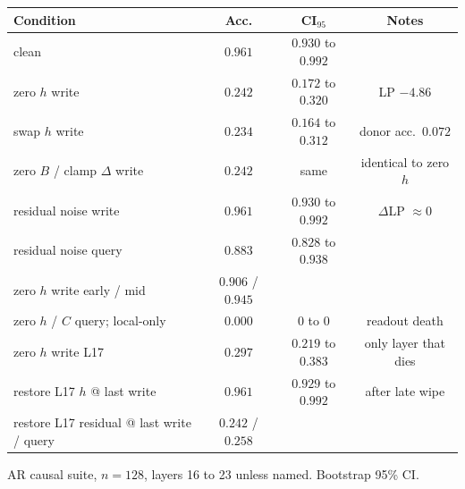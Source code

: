 \documentclass[11pt]{article}
\begin{document}
\begin{center}
\small
\begin{tabular}{@{}lccc@{}}
\toprule
Condition & Acc. & CI$_{95}$ & Notes \\
\midrule
clean & $0.961$ & $0.930$ to $0.992$ & \\
zero $h$ write & $0.242$ & $0.172$ to $0.320$ & LP $-4.86$ \\
swap $h$ write & $0.234$ & $0.164$ to $0.312$ & donor acc.\ $0.072$ \\
zero $B$ / clamp $\Delta$ write & $0.242$ & same & identical to zero $h$ \\
residual noise write & $0.961$ & $0.930$ to $0.992$ & $\Delta$LP $\approx 0$ \\
residual noise query & $0.883$ & $0.828$ to $0.938$ & \\
zero $h$ write early / mid & $0.906$ / $0.945$ & & \\
zero $h$ / $C$ query; local-only & $0.000$ & $0$ to $0$ & readout death \\
zero $h$ write L17 & $0.297$ & $0.219$ to $0.383$ & only layer that dies \\
restore L17 $h$ @ last write & $0.961$ & $0.929$ to $0.992$ & after late wipe \\
restore L17 residual @ last write / query & $0.242$ / $0.258$ & & \\
\bottomrule
\end{tabular}
\end{center}

\vspace{0.4cm}
{\small AR causal suite, $n=128$, layers 16 to 23 unless named. Bootstrap 95\% CI.}
\end{document}
